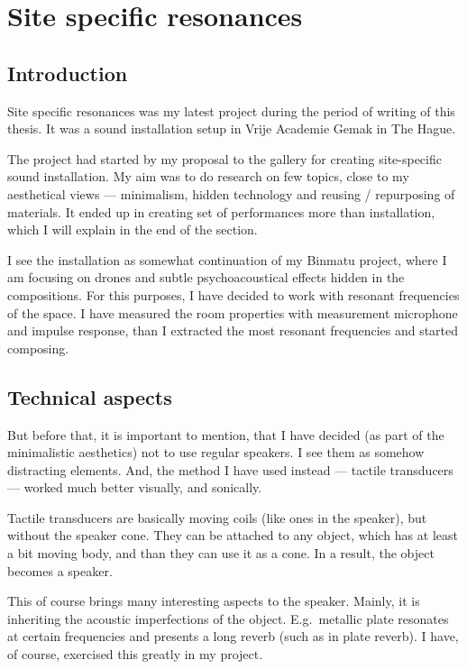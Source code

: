 \documentclass[12pt,a4paper,oneside]{report}
\begin{document}

\clearpage
\section{Site specific resonances}
\subsection{Introduction}
Site specific resonances was my latest project during the period of writing of this thesis. It was a sound installation setup in Vrije Academie Gemak in The Hague.

The project had started by my proposal to the gallery for creating site-specific sound installation. My aim was to do research on few topics, close to my aesthetical views --- minimalism, hidden technology and reusing / repurposing of materials. It ended up in creating set of performances more than installation, which I will explain in the end of the section.

I see the installation as somewhat continuation of my Binmatu project, where I am focusing on drones and subtle psychoacoustical effects hidden in the compositions. For this purposes, I have decided to work with resonant frequencies of the space. I have measured the room properties with measurement microphone and impulse response, than I extracted the most resonant frequencies and started composing.

\subsection{Technical aspects}

But before that, it is important to mention, that I have decided (as part of the minimalistic aesthetics) not to use regular speakers. I see them as somehow distracting elements. And, the method I have used instead --- tactile transducers --- worked much better visually, and sonically.

Tactile transducers are basically moving coils (like ones in the speaker), but without the speaker cone. They can be attached to any object, which has at least a bit moving body, and than they can use it as a cone. In a result, the object becomes a speaker. 

This of course brings many interesting aspects to the speaker. Mainly, it is inheriting the acoustic imperfections of the object. E.g.\ metallic plate resonates at certain frequencies and presents a long reverb (such as in plate reverb). I have, of course, exercised this greatly in my project.
\end{document}
